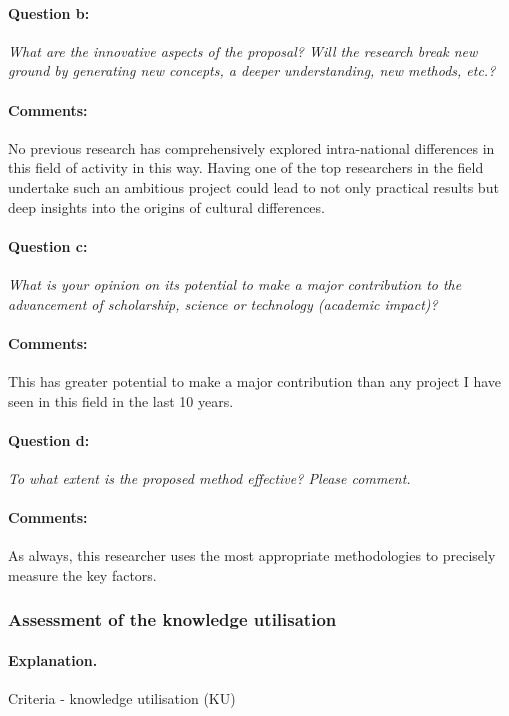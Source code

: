 \documentclass[twocolumn, serif, rga, numeric]{jote-article}
\begin{document}
\paragraph{Question b:}
\textit{What are the innovative aspects of the proposal? Will the research break new ground by generating new concepts, a deeper understanding, new methods, etc.?}
\paragraph{Comments:}
No previous research has comprehensively explored intra-national differences in this field of activity in this way. Having one of the top researchers in the field undertake such an ambitious project could lead to not only practical results but deep insights into the origins of cultural differences.
\paragraph{Question c:}
\textit{What is your opinion on its potential to make a major contribution to the advancement of scholarship, science or technology (academic impact)?}
\paragraph{Comments:}
This has greater potential to make a major contribution than any project I have seen in this field in the last 10 years.
\paragraph{Question d:}
\textit{To what extent is the proposed method effective? Please comment.}
\paragraph{Comments:}
As always, this researcher uses the most appropriate methodologies to precisely measure the key factors.

 {}\subsubsection*{Assessment of the knowledge utilisation} 
\paragraph{Explanation.}
Criteria - knowledge utilisation (KU)
\end{document}
